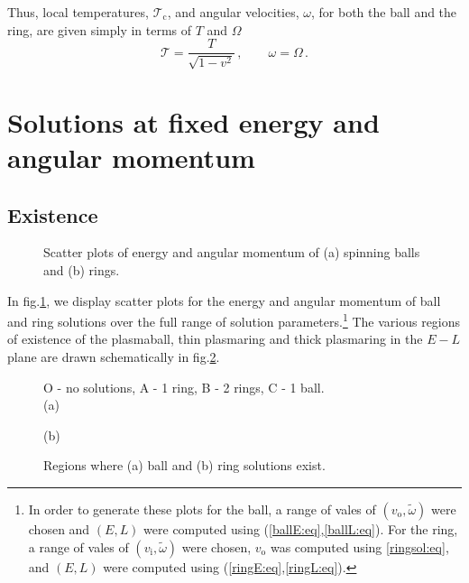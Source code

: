 \documentclass[12pt,a4paper]{article}
\newcommand{\tc}{\mathcal{T_\mathrm{c}}}
\newcommand{\tloc}{\mathcal{T}}
\newcommand{\vi}{v_\mathrm{i}}
\newcommand{\vo}{v_\mathrm{o}}
\newcommand{\tw}{\widetilde{\omega}}
\newcommand{\Red}[1]{{\color{red} #1}}
\newcommand{\Green}[1]{{\color{green} #1}}
\newcommand{\Blue}[1]{{\color{blue} #1}}
\begin{document}
Thus, local temperatures, $\tc$, and angular velocities, $\omega$,
for both the ball and the ring, are given simply in terms of $T$ and
$\Omega$
%
\begin{equation*}
  \tloc = \frac{T}{\sqrt{1-v^2}}\,, \qquad \omega=\Omega\,.
\end{equation*}
%


\section{Solutions at fixed energy and angular
momentum}\label{sec:enang}

\subsection{Existence}\label{sec:exist}

\begin{figure}
%
\begin{center}
  
  \hspace{2.5cm}
  
%  
  \caption{Scatter plots of energy and angular momentum of (a)
spinning balls and (b) rings.}\label{exist_scat:fig}
\end{center}
\end{figure}

In fig.\ref{exist_scat:fig}, we display scatter plots for the energy
and angular momentum of ball and ring solutions over the full range
of solution parameters.\footnote{In order to generate these plots
for the ball, a range of vales of $(\vo,\tw)$ were chosen and
$(E,L)$ were computed using (\ref{ballE:eq},\ref{ballL:eq}). For the
ring, a range of vales of $(\vi,\tw)$ were chosen, $\vo$ was
computed using \eqref{ringsol:eq}, and $(E,L)$ were computed using
(\ref{ringE:eq},\ref{ringL:eq}).} The various regions of existence
of the plasmaball, thin plasmaring and thick plasmaring in the $E-L$
plane are drawn schematically in fig.\ref{exist_prelim:fig}.

\begin{figure}
%
 \begin{center}
 \small{O - no solutions, A - 1 ring, B - 2 rings, C - 1 ball.}\\
  (a)%
  
  \hspace{2.5cm}
  (b)%
  
 \caption{Regions where (a) ball and (b) ring solutions
exist.}\label{exist_prelim:fig}
 \end{center}
\end{figure}
\end{document}
